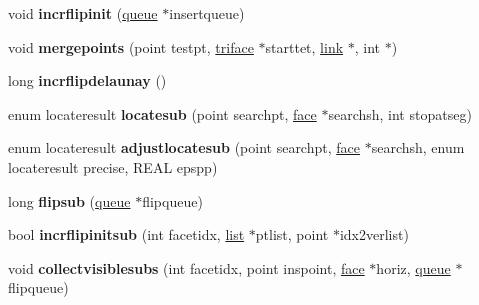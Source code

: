 \begin{DoxyCompactItemize}
\item 
\mbox{\label{classStemMesh3D_1_1tetgenmesh_aa6a654aee9d32733111cbfe68478413b}} 
void {\bfseries incrflipinit} (\hyperlink{classStemMesh3D_1_1tetgenmesh_1_1queue}{queue} $\ast$insertqueue)
\item 
\mbox{\label{classStemMesh3D_1_1tetgenmesh_a368a8455b28cdf00100ab5d1291bb1ed}} 
void {\bfseries mergepoints} (point testpt, \hyperlink{classStemMesh3D_1_1tetgenmesh_1_1triface}{triface} $\ast$starttet, \hyperlink{classStemMesh3D_1_1tetgenmesh_1_1link}{link} $\ast$, int $\ast$)
\item 
\mbox{\label{classStemMesh3D_1_1tetgenmesh_ab7ca803b7bd9b2e974bf468aaa223169}} 
long {\bfseries incrflipdelaunay} ()
\item 
\mbox{\label{classStemMesh3D_1_1tetgenmesh_a189ab0392034577a3d8e36f60b27f75f}} 
enum locateresult {\bfseries locatesub} (point searchpt, \hyperlink{classStemMesh3D_1_1tetgenmesh_1_1face}{face} $\ast$searchsh, int stopatseg)
\item 
\mbox{\label{classStemMesh3D_1_1tetgenmesh_a3bcd52a70d69a15ea4fbe9e350e248bd}} 
enum locateresult {\bfseries adjustlocatesub} (point searchpt, \hyperlink{classStemMesh3D_1_1tetgenmesh_1_1face}{face} $\ast$searchsh, enum locateresult precise, R\+E\+AL epspp)
\item 
\mbox{\label{classStemMesh3D_1_1tetgenmesh_a19176fef4a4bde58292ffbcad783005e}} 
long {\bfseries flipsub} (\hyperlink{classStemMesh3D_1_1tetgenmesh_1_1queue}{queue} $\ast$flipqueue)
\item 
\mbox{\label{classStemMesh3D_1_1tetgenmesh_ab2050e792abccded295764bb3cfd4c95}} 
bool {\bfseries incrflipinitsub} (int facetidx, \hyperlink{classStemMesh3D_1_1tetgenmesh_1_1list}{list} $\ast$ptlist, point $\ast$idx2verlist)
\item 
\mbox{\label{classStemMesh3D_1_1tetgenmesh_abea0be2bfae7c59025170212f3ca591d}} 
void {\bfseries collectvisiblesubs} (int facetidx, point inspoint, \hyperlink{classStemMesh3D_1_1tetgenmesh_1_1face}{face} $\ast$horiz, \hyperlink{classStemMesh3D_1_1tetgenmesh_1_1queue}{queue} $\ast$flipqueue)

\end{DoxyCompactItemize}
